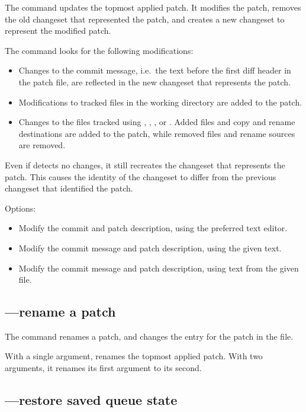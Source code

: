 The  command updates the topmost applied patch.  It
modifies the patch, removes the old changeset that represented the
patch, and creates a new changeset to represent the modified patch.

The  command looks for the following modifications:
\begin{itemize}
\item Changes to the commit message, i.e.~the text before the first
  diff header in the patch file, are reflected in the new changeset
  that represents the patch.
\item Modifications to tracked files in the working directory are
  added to the patch.
\item Changes to the files tracked using , ,
  , or .  Added files and copy and rename
  destinations are added to the patch, while removed files and rename
  sources are removed.
\end{itemize}

Even if  detects no changes, it still recreates the
changeset that represents the patch.  This causes the identity of the
changeset to differ from the previous changeset that identified the
patch.

Options:
\begin{itemize}
\item[\hgxopt{mq}{qrefresh}{-e}] Modify the commit and patch description,
  using the preferred text editor.
\item[\hgxopt{mq}{qrefresh}{-m}] Modify the commit message and patch
  description, using the given text.
\item[\hgxopt{mq}{qrefresh}{-l}] Modify the commit message and patch
  description, using text from the given file.
\end{itemize}

\subsection{---rename a patch}

The  command renames a patch, and changes the entry for
the patch in the  file.

With a single argument,  renames the topmost applied
patch.  With two arguments, it renames its first argument to its
second.

\subsection{---restore saved queue state}

